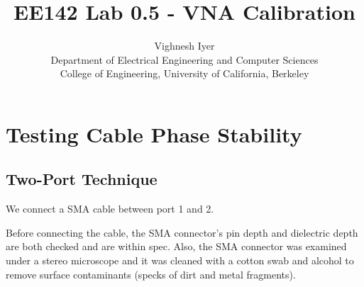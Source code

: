 \documentclass[11pt]{article}
\begin{document}
\title{EE142 Lab 0.5 - VNA Calibration}

\author{Vighnesh Iyer \\
Department of Electrical Engineering and Computer Sciences\\
College of Engineering, University of California, Berkeley}
\date{}
\maketitle

\section{Testing Cable Phase Stability}

\subsection{Two-Port Technique}
We connect a SMA cable between port 1 and 2. 

Before connecting the cable, the SMA connector's pin depth and dielectric depth are both checked and are within spec. Also, the SMA connector was examined under a stereo microscope and it was cleaned with a cotton swab and alcohol to remove surface contaminants (specks of dirt and metal fragments).
\end{document}
